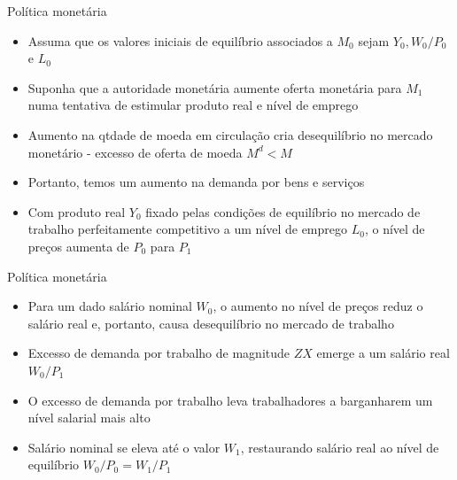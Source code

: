 \documentclass[10pt]{beamer}
\begin{document}
\begin{frame}
    {Política monetária}
    \begin{itemize}
        \item Assuma que os valores iniciais de equilíbrio associados a $M_0$ sejam $Y_0, W_0/P_0$ e $L_0$\bigskip
        \item Suponha que a autoridade monetária aumente oferta monetária para $M_1$ numa tentativa de estimular produto real e nível de emprego\bigskip
        \item Aumento na qtdade de moeda em circulação cria desequilíbrio no mercado monetário - excesso de oferta de moeda $M^d<M$\bigskip
        \item Portanto, temos um aumento na demanda por bens e serviços\bigskip
        \item Com produto real $Y_0$ fixado pelas condições de equilíbrio no mercado de trabalho perfeitamente competitivo a um nível de emprego $L_0$, o nível de preços aumenta de $P_0$ para $P_1$
    \end{itemize}
\end{frame}

\begin{frame}
    {Política monetária}
    \begin{itemize}
        \item Para um dado salário nominal $W_0$, o aumento no nível de preços reduz o salário real e, portanto, causa desequilíbrio no mercado de trabalho\bigskip
        \item Excesso de demanda por trabalho de magnitude $ZX$ emerge a um salário real $W_0/P_1$\bigskip
        \item O excesso de demanda por trabalho leva trabalhadores a barganharem um nível salarial mais alto\bigskip
        \item Salário nominal se eleva até o valor $W_1$, restaurando salário real ao nível de equilíbrio $W_0/P_0 = W_1/P_1$
    \end{itemize}
\end{frame}
\end{document}
